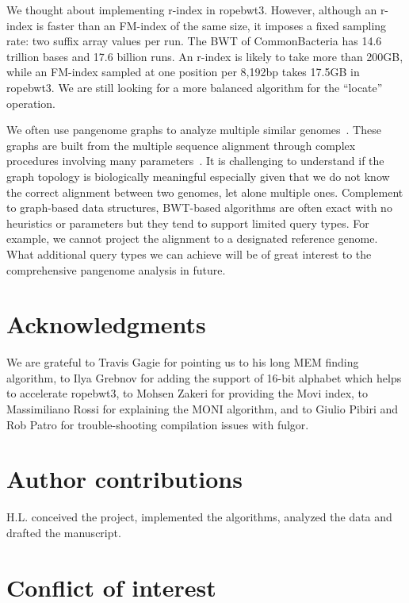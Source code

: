 \documentclass[webpdf,contemporary,large,namedate]{oup-authoring-template}%
\begin{document}
We thought about implementing r-index in ropebwt3.
However, although an r-index is faster than an FM-index of the same size,
it imposes a fixed sampling rate: two suffix array values per run.
The BWT of CommonBacteria has 14.6 trillion bases and 17.6 billion runs.
An r-index is likely to take more than 200GB,
while an FM-index sampled at one position per 8,192bp takes 17.5GB in ropebwt3.
We are still looking for a more balanced algorithm for the ``locate'' operation.

We often use pangenome graphs to analyze multiple similar genomes~\citep{Liao:2023aa}.
These graphs are built from the multiple sequence alignment through complex procedures involving many parameters~\citep{Li:2020aa,Hickey:2023aa,Garrison2023.04.05.535718}.
It is challenging to understand if the graph topology is biologically meaningful especially given that we do not know the correct alignment between two genomes, let alone multiple ones.
Complement to graph-based data structures, BWT-based algorithms are often exact with no heuristics or parameters but they tend to support limited query types.
For example, we cannot project the alignment to a designated reference genome.
What additional query types we can achieve will be of great interest to the comprehensive pangenome analysis in future.

\section*{Acknowledgments}

We are grateful to Travis Gagie for pointing us to his long MEM finding algorithm,
to Ilya Grebnov for adding the support of 16-bit alphabet which helps to accelerate ropebwt3,
to Mohsen Zakeri for providing the Movi index,
to Massimiliano Rossi for explaining the MONI algorithm,
and to Giulio Pibiri and Rob Patro for trouble-shooting compilation issues with fulgor.

\section*{Author contributions}

H.L. conceived the project, implemented the algorithms, analyzed the data and drafted the manuscript.

\section*{Conflict of interest}
\end{document}
